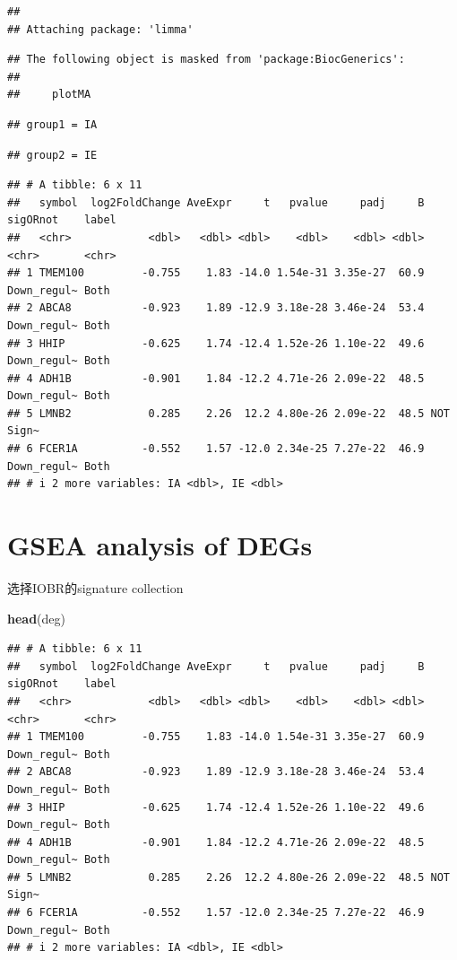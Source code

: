\documentclass[
  12pt,
]{book}
\newenvironment{Shaded}{\begin{snugshade}}{\end{snugshade}}
\newcommand{\FunctionTok}[1]{\textcolor[rgb]{0.13,0.29,0.53}{\textbf{#1}}}
\newcommand{\NormalTok}[1]{#1}
\theoremstyle{definition}
\theoremstyle{definition}
\theoremstyle{definition}
\theoremstyle{definition}
\theoremstyle{remark}
\begin{document}
\begin{verbatim}
## 
## Attaching package: 'limma'
\end{verbatim}

\begin{verbatim}
## The following object is masked from 'package:BiocGenerics':
## 
##     plotMA
\end{verbatim}

\begin{verbatim}
## group1 = IA
\end{verbatim}

\begin{verbatim}
## group2 = IE
\end{verbatim}

\begin{verbatim}
## # A tibble: 6 x 11
##   symbol  log2FoldChange AveExpr     t   pvalue     padj     B sigORnot    label
##   <chr>            <dbl>   <dbl> <dbl>    <dbl>    <dbl> <dbl> <chr>       <chr>
## 1 TMEM100         -0.755    1.83 -14.0 1.54e-31 3.35e-27  60.9 Down_regul~ Both 
## 2 ABCA8           -0.923    1.89 -12.9 3.18e-28 3.46e-24  53.4 Down_regul~ Both 
## 3 HHIP            -0.625    1.74 -12.4 1.52e-26 1.10e-22  49.6 Down_regul~ Both 
## 4 ADH1B           -0.901    1.84 -12.2 4.71e-26 2.09e-22  48.5 Down_regul~ Both 
## 5 LMNB2            0.285    2.26  12.2 4.80e-26 2.09e-22  48.5 NOT         Sign~
## 6 FCER1A          -0.552    1.57 -12.0 2.34e-25 7.27e-22  46.9 Down_regul~ Both 
## # i 2 more variables: IA <dbl>, IE <dbl>
\end{verbatim}

\hypertarget{gsea-analysis-of-degs}{%
\section{GSEA analysis of DEGs}\label{gsea-analysis-of-degs}}

选择IOBR的signature collection

\begin{Shaded}
\begin{Highlighting}[]
\FunctionTok{head}\NormalTok{(deg)}
\end{Highlighting}
\end{Shaded}

\begin{verbatim}
## # A tibble: 6 x 11
##   symbol  log2FoldChange AveExpr     t   pvalue     padj     B sigORnot    label
##   <chr>            <dbl>   <dbl> <dbl>    <dbl>    <dbl> <dbl> <chr>       <chr>
## 1 TMEM100         -0.755    1.83 -14.0 1.54e-31 3.35e-27  60.9 Down_regul~ Both 
## 2 ABCA8           -0.923    1.89 -12.9 3.18e-28 3.46e-24  53.4 Down_regul~ Both 
## 3 HHIP            -0.625    1.74 -12.4 1.52e-26 1.10e-22  49.6 Down_regul~ Both 
## 4 ADH1B           -0.901    1.84 -12.2 4.71e-26 2.09e-22  48.5 Down_regul~ Both 
## 5 LMNB2            0.285    2.26  12.2 4.80e-26 2.09e-22  48.5 NOT         Sign~
## 6 FCER1A          -0.552    1.57 -12.0 2.34e-25 7.27e-22  46.9 Down_regul~ Both 
## # i 2 more variables: IA <dbl>, IE <dbl>
\end{verbatim}
\end{document}
